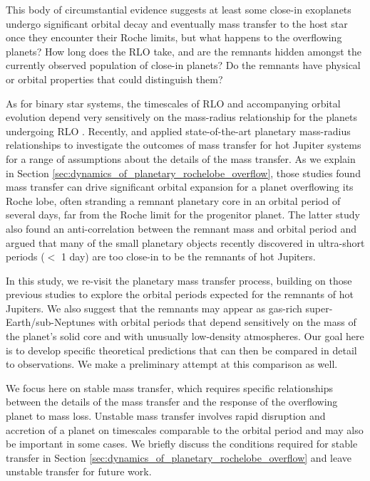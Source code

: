 \documentclass{svjour3}                     %
\begin{document}
This body of circumstantial evidence suggests at least some close-in exoplanets undergo significant orbital decay and eventually mass transfer to the host star once they encounter their Roche limits, but what happens to the overflowing planets? How long does the RLO take, and are the remnants hidden amongst the currently observed population of close-in planets? Do the remnants have physical or orbital properties that could distinguish them? 

As for binary star systems, the timescales of RLO and accompanying orbital evolution depend very sensitively on the mass-radius relationship for the planets undergoing RLO \cite{Rappaport1982}. Recently, \cite{2014ApJ...793L...3V} and \cite{2015ApJ...813..101V} applied state-of-the-art planetary mass-radius relationships to investigate the outcomes of mass transfer for hot Jupiter systems for a range of assumptions about the details of the mass transfer. As we explain in Section \ref{sec:dynamics_of_planetary_rochelobe_overflow}, those studies found mass transfer can drive significant orbital expansion for a planet overflowing its Roche lobe, often stranding a remnant planetary core in an orbital period of several days, far from the Roche limit for the progenitor planet. The latter study also found an anti-correlation between the remnant mass and orbital period and argued that many of the small planetary objects recently discovered in ultra-short periods ($<$ 1 day) \cite{2014ApJ...787...47S,2016arXiv160306488A} are too close-in to be the remnants of hot Jupiters.

In this study, we re-visit the planetary mass transfer process, building on those previous studies to explore the orbital periods expected for the remnants of hot Jupiters. We also suggest that the remnants may appear as gas-rich super-Earth/sub-Neptunes with orbital periods that depend sensitively on the mass of the planet's solid core and with unusually low-density atmospheres. Our goal here is to develop specific theoretical predictions that can then be compared in detail to observations. We make a preliminary attempt at this comparison as well.

We focus here on stable mass transfer, which requires specific relationships between the details of the mass transfer and the response of the overflowing planet to mass loss. Unstable mass transfer involves rapid disruption and accretion of a planet on timescales comparable to the orbital period \cite{2002ApJ...565.1107P} and may also be important in some cases. We briefly discuss the conditions required for stable transfer in Section \ref{sec:dynamics_of_planetary_rochelobe_overflow} and leave unstable transfer for future work.
\end{document}
